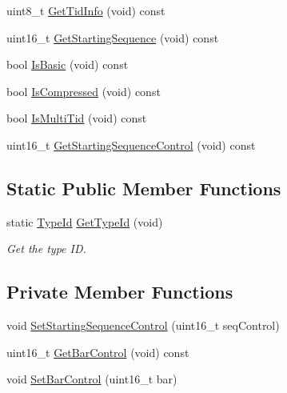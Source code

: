 \begin{DoxyCompactItemize}
uint8\+\_\+t \hyperlink{classns3_1_1CtrlBAckRequestHeader_a8eb759c3a33ab14c508a14f260f8e953}{Get\+Tid\+Info} (void) const 
\item 
uint16\+\_\+t \hyperlink{classns3_1_1CtrlBAckRequestHeader_a61c777167be42b75ceedbcf10d890378}{Get\+Starting\+Sequence} (void) const 
\item 
bool \hyperlink{classns3_1_1CtrlBAckRequestHeader_ad44c908727cf9ab2a53685e0f431780a}{Is\+Basic} (void) const 
\item 
bool \hyperlink{classns3_1_1CtrlBAckRequestHeader_af571db368fece41b1eda6dd2395c9f9b}{Is\+Compressed} (void) const 
\item 
bool \hyperlink{classns3_1_1CtrlBAckRequestHeader_afa8c49397e4de304a55d0a5bbb98bef1}{Is\+Multi\+Tid} (void) const 
\item 
uint16\+\_\+t \hyperlink{classns3_1_1CtrlBAckRequestHeader_ae5822f97d0d4f0a2ec88a8a928144444}{Get\+Starting\+Sequence\+Control} (void) const 
\end{DoxyCompactItemize}
\subsection*{Static Public Member Functions}
\begin{DoxyCompactItemize}
\item 
static \hyperlink{classns3_1_1TypeId}{Type\+Id} \hyperlink{classns3_1_1CtrlBAckRequestHeader_a8de4be7b2bc554e883fe17ee63b71ec8}{Get\+Type\+Id} (void)
\begin{DoxyCompactList}\small\item\em Get the type ID. \end{DoxyCompactList}\end{DoxyCompactItemize}
\subsection*{Private Member Functions}
\begin{DoxyCompactItemize}
\item 
void \hyperlink{classns3_1_1CtrlBAckRequestHeader_aa1307bf1a5479bdad9ffd2963ef1e119}{Set\+Starting\+Sequence\+Control} (uint16\+\_\+t seq\+Control)
\item 
uint16\+\_\+t \hyperlink{classns3_1_1CtrlBAckRequestHeader_a7e9a612766996bef1bd679defc9c1fba}{Get\+Bar\+Control} (void) const 
\item 
void \hyperlink{classns3_1_1CtrlBAckRequestHeader_aca545d2a090ef7c80e129765bf713be8}{Set\+Bar\+Control} (uint16\+\_\+t bar)
\end{DoxyCompactItemize}
